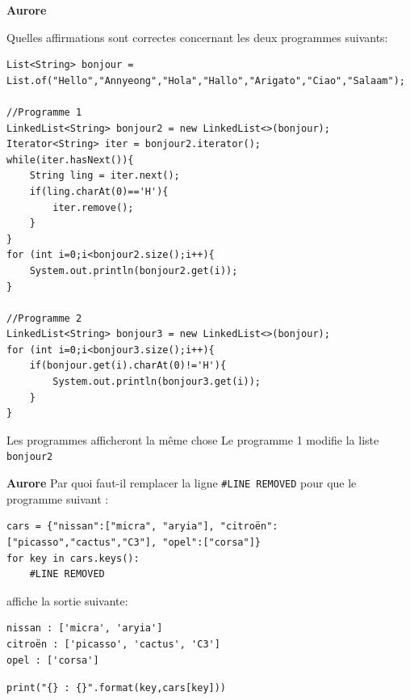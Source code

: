 \begin{Exercice}[5 minutes]\textbf{Aurore}

Quelles affirmations sont correctes concernant les deux programmes suivants:

\begin{lstlisting}[style=javastyle]
List<String> bonjour = List.of("Hello","Annyeong","Hola","Hallo","Arigato","Ciao","Salaam");
        
//Programme 1
LinkedList<String> bonjour2 = new LinkedList<>(bonjour);
Iterator<String> iter = bonjour2.iterator();
while(iter.hasNext()){
    String ling = iter.next();
    if(ling.charAt(0)=='H'){
        iter.remove();
    }
}
for (int i=0;i<bonjour2.size();i++){
    System.out.println(bonjour2.get(i));
}

//Programme 2
LinkedList<String> bonjour3 = new LinkedList<>(bonjour);
for (int i=0;i<bonjour3.size();i++){
    if(bonjour.get(i).charAt(0)!='H'){
        System.out.println(bonjour3.get(i));
    }
}
\end{lstlisting}



\begin{solution}
Les programmes afficheront la même chose \newline 
Le programme 1 modifie la liste \texttt{bonjour2}

\end{solution}
\end{Exercice}

\begin{Exercice}[5 minutes]\textbf{Aurore}
Par quoi faut-il remplacer la ligne \texttt{\#LINE REMOVED} pour que le programme suivant :
\begin{lstlisting}[style=pythonstyle]
cars = {"nissan":["micra", "aryia"], "citroën":["picasso","cactus","C3"], "opel":["corsa"]}
for key in cars.keys():
    #LINE REMOVED
\end{lstlisting}
affiche la sortie suivante:

\begin{verbatim}
nissan : ['micra', 'aryia']
citroën : ['picasso', 'cactus', 'C3']
opel : ['corsa']
\end{verbatim}


\begin{solution}
\texttt{\texttt{print("\{\} : \{\}".format(key,cars[key]))}}
\end{solution}
\end{Exercice}

